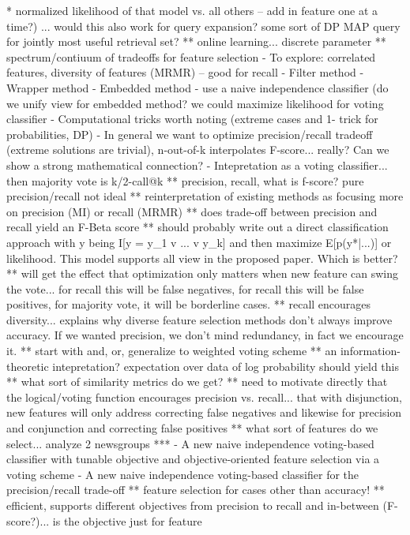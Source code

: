 * normalized likelihood of that model vs. all others -- add in feature one at a time?)
... would this also work for query expansion?  some sort of DP MAP query for jointly most useful retrieval set?
** online learning... discrete parameter
** spectrum/contiuum of tradeoffs for feature selection
- To explore: correlated features, diversity of features (MRMR) -- good for recall
- Filter method
- Wrapper method
- Embedded method - use a naive independence classifier
  (do we unify view for embedded method?  we could maximize likelihood for voting classifier	
- Computational tricks worth noting (extreme cases and 1- trick for probabilities, DP)
- In general we want to optimize precision/recall tradeoff (extreme solutions are trivial), n-out-of-k interpolates F-score... really?  Can 
we show a strong mathematical connection?
- Intepretation as a voting classifier... then majority vote is k/2-call@k
** precision, recall, what is f-score?  pure precision/recall not ideal
** reinterpretation of existing methods as focusing more on precision (MI) or recall (MRMR)
** does trade-off between precision and recall yield an F-Beta score
** should probably write out a direct classification approach with y being I[y = y_1 v ... v y_k] and then maximize E[p(y*|...)] or 
likelihood.  This model supports all view in the proposed paper.  Which is better?
** will get the effect that optimization only matters when new feature can swing the vote... for recall this will be false negatives, for 
recall this will be false positives, for majority vote, it will be borderline cases.
** recall encourages diversity... explains why diverse feature selection methods don't always improve accuracy.  If we wanted precision, we 
don't mind redundancy, in fact we encourage it.
** start with and, or, generalize to weighted voting scheme
** an information-theoretic intepretation?  expectation over data of log probability should yield this
** what sort of similarity metrics do we get?
** need to motivate directly that the logical/voting function encourages precision vs. recall... that with disjunction, new features will 
only address correcting false negatives and likewise for precision and conjunction and correcting false positives
** what sort of features do we select... analyze 2 newsgroups
***
- A new naive independence voting-based classifier with tunable objective and objective-oriented feature selection via a voting scheme
- A new naive independence voting-based classifier for the precision/recall trade-off
** feature selection for cases other than accuracy!
** efficient, supports different objectives from precision to recall and in-between (F-score?)... is the objective just for feature 

